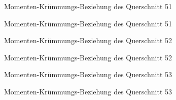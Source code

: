 \documentclass[
  11pt,
  letterpaper,
]{scrreprt}
\begin{document}
\begin{figure}[H]


\caption{\label{fig-qs_51}Momenten-Krümmungs-Beziehung des Querschnitt
51}

\end{figure}%

\begin{figure}[H]


\caption{\label{fig-m_chi_51}Momenten-Krümmungs-Beziehung des
Querschnitt 51}

\end{figure}%

\begin{figure}[H]


\caption{\label{fig-qs_52}Momenten-Krümmungs-Beziehung des Querschnitt
52}

\end{figure}%

\begin{figure}[H]


\caption{\label{fig-m_chi_52}Momenten-Krümmungs-Beziehung des
Querschnitt 52}

\end{figure}%

\begin{figure}[H]


\caption{\label{fig-qs_53}Momenten-Krümmungs-Beziehung des Querschnitt
53}

\end{figure}%

\begin{figure}[H]


\caption{\label{fig-m_chi_53}Momenten-Krümmungs-Beziehung des
Querschnitt 53}

\end{figure}%
\end{document}
